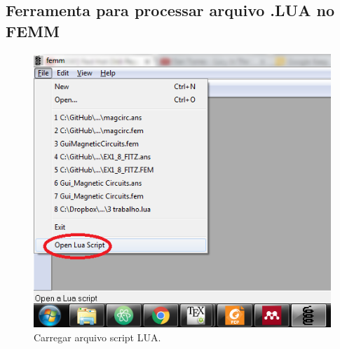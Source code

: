 \subsection{Ferramenta para processar arquivo .LUA no FEMM}
\begin{figure}[h]
\centering
\includegraphics[scale=1]{img/assig2/open_lua_script.png}
\caption[Carregar arquivo script LUA]{Carregar arquivo script LUA.}
\label{circ}
\end{figure}
